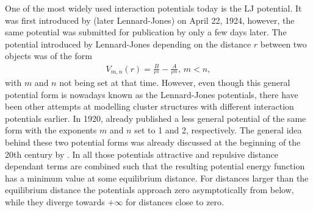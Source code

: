 One of the most widely used interaction potentials today is the \ac{LJ}
potential. It was first introduced by
\citeauthor{Jones_DeterminationMolecularFields_1924} (later Lennard-Jones) on
April 22, 1924\autocite{Jones_DeterminationMolecularFields_1924}, however, the
same potential was submitted for publication by
\citeauthor{Simon_KristallstrukturArgons_1924} only a few days
later.\autocite{Simon_KristallstrukturArgons_1924} The potential introduced by
Lennard-Jones depending on the distance $r$ between two objects was of the form
%
\begin{align}
    V_{m,n}(r)=\frac{B}{r^n}-\frac{A}{r^m},\, m<n,\label{eqn:LJgeneral}
\end{align}
%
with $m$ and $n$ not being set at that time. However, even though this general
potential form is nowadays known as the Lennard-Jones potentials, there have
been other attempts at modelling cluster structures with different interaction
potentials earlier. In 1920,
\citeauthor{Kratzer_ultrarotenRotationsspektrenHalogenwasserstoffe_1920}\autocite{Kratzer_ultrarotenRotationsspektrenHalogenwasserstoffe_1920}
already published a less general potential of the same form with the exponents
$m$ and $n$ set to 1 and 2, respectively. The general idea behind these two
potential forms was already discussed at the beginning of the 20th century by
\citeauthor{Mie_ZurkinetischenTheorie_1903}\autocite{Mie_ZurkinetischenTheorie_1903}.
In all those potentials attractive and repulsive distance dependant terms are
combined such that the resulting potential energy function has a minimum value
at some equilibrium distance. For distances larger than the equilibrium
distance the potentials approach zero asymptotically from below, while they
diverge towards $+\infty$ for distances close to zero.



